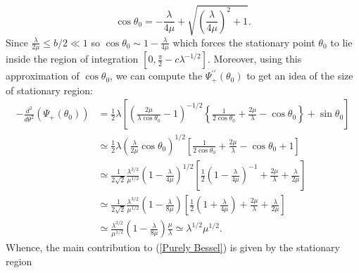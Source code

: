 \documentclass[11pt, reqno]{amsart}
\theoremstyle{plain}
\theoremstyle{remark}
\theoremstyle{example}
\theoremstyle{definition}
\numberwithin{equation}{section}
\begin{document}
 \begin{equation*}
     \cos{\theta_{0}}= - \frac{\lambda}{4 \mu} + \sqrt{ \left( \frac{\lambda}{4 \mu}  \right)^2 + 1 }.
 \end{equation*}
 Since $\frac{\lambda}{2 \mu} \leq b/2 \ll 1$ so $\cos{\theta_{0}} \sim 1 - \frac{\lambda}{4 \mu}$  which forces the stationary point $\theta_{0}$ to lie inside the region of integration $[0,  \frac{\pi}{2} - c \lambda^{-1/2}] $. 
Moreover, using this approximation of $\cos{\theta_{0}}$,  we can compute the $\Psi_{+}^{\prime \prime}(\theta_{0})$ to get an idea of the size of stationary region:
 \begin{equation}\label{size stationary2}
   \begin{split}
        -\frac{d^2}{d \theta^2} \left( \Psi_{+} (\theta_{0})  \right) & =  \frac{1}{2} \lambda  \left[  \left(  \frac{2 \mu}{ \lambda \cos{\theta_{0}}} -1 \right)^{-1/2} \left\lbrace  \frac{1}{2 \cos{\theta_{0}}}    + \frac{2\mu}{\lambda} - \cos{ \theta_{0}}  \right\rbrace + \sin{\theta_{0}}  \right]\\
        & \simeq \frac{1}{2} \lambda  \left(  \frac{\lambda}{ 2 \mu } \cos{\theta_{0}}  \right)^{1/2} \left[   \frac{1}{2 \cos{\theta_{0}}}    + \frac{2\mu}{\lambda} - \cos{ \theta_{0}}     + 1  \right]\\
        & \simeq   \frac{1}{2\sqrt{2}} \frac{ \lambda^{3/2} }{\mu^{1/2}}  \left(  1-  \frac{\lambda}{ 4 \mu }   \right)^{1/2} \left[   \frac{1}{2 }\left(  1-  \frac{\lambda}{ 4 \mu }   \right)^{-1}    + \frac{2\mu}{\lambda} + \frac{\lambda}{2 \mu}  \right]\\
        & \simeq   \frac{1}{2\sqrt{2}} \frac{ \lambda^{3/2} }{\mu^{1/2}}  \left(  1-  \frac{\lambda}{ 8 \mu }   \right) \left[   \frac{1}{2 }\left(  1 + \frac{\lambda}{ 4 \mu }   \right)    + \frac{2\mu}{\lambda} + \frac{\lambda}{2 \mu}  \right]\\
        & \simeq   \frac{ \lambda^{3/2} }{\mu^{1/2}}  \left(  1-  \frac{\lambda}{ 8 \mu }   \right) \frac{\mu}{\lambda} \simeq   \lambda^{1/2} \mu^{1/2}.
   \end{split}
\end{equation}
Whence, the main contribution to (\ref{Purely Bessel}) is given by the stationary region
\end{document}
